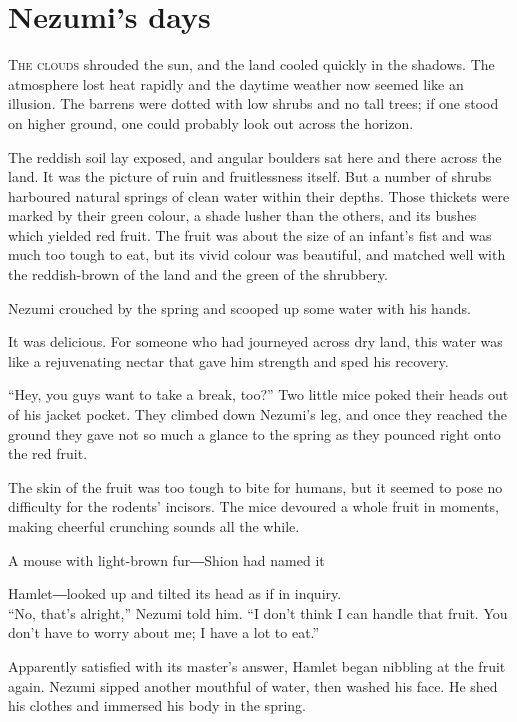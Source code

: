 
\chapter{Nezumi's days}

\lettrine{T}{he clouds} shrouded the sun, and the land cooled quickly in the shadows.
The atmosphere lost heat rapidly and the daytime weather now seemed like
an illusion. The barrens were dotted with low shrubs and no tall trees;
if one stood on higher ground, one could probably look out across the
horizon.

The reddish soil lay exposed, and angular boulders sat here and there
across the land. It was the picture of ruin and fruitlessness itself.
But a number of shrubs harboured natural springs of clean water within
their depths. Those thickets were marked by their green colour, a shade
lusher than the others, and its bushes which yielded red fruit. The
fruit was about the size of an infant's fist and was much too tough to
eat, but its vivid colour was beautiful, and matched well with the
reddish-brown of the land and the green of the shrubbery.

Nezumi crouched by the spring and scooped up some water with his hands.

It was delicious. For someone who had journeyed across dry land, this
water was like a rejuvenating nectar that gave him strength and sped his
recovery.

``Hey, you guys want to take a break, too?'' Two little mice poked their
heads out of his jacket pocket. They climbed down Nezumi's leg, and once
they reached the ground they gave not so much a glance to the spring as
they pounced right onto the red fruit.

The skin of the fruit was too tough to bite for humans, but it seemed to
pose no difficulty for the rodents' incisors. The mice devoured a whole
fruit in moments, making cheerful crunching sounds all the while.

A mouse with light-brown fur―Shion had named it~

Hamlet―looked up and tilted its head as if in inquiry.\\

``No, that's alright,'' Nezumi told him. ``I don't think I can handle
that fruit. You don't have to worry about me; I have a lot to eat.''

Apparently satisfied with its master's answer, Hamlet began nibbling at
the fruit again. Nezumi sipped another mouthful of water, then washed
his face. He shed his clothes and immersed his body in the spring.

